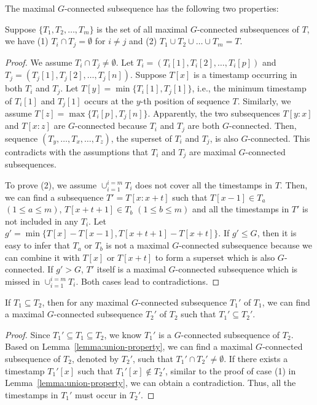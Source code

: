 The maximal $G$-connected subsequence has the following two properties:
\begin{lemma}\label{lemma:union-property}
Suppose $\{T_1,T_2,\ldots,T_m\}$ is the set of all maximal $G$-connected subsequences of $T$, we have (1) $T_i\cap T_j=\emptyset$ for $i\neq j$ and (2) $T_1\cup T_2\cup\ldots\cup T_m=T$.
\end{lemma}
\begin{proof}
We assume $T_i\cap T_j\neq \emptyset$. Let $T_i=(T_i[1], T_i[2],\ldots,T_i[p])$ and $T_j= (T_j[1], T_j[2],\ldots,T_j[n])$. Suppose $T[x]$ is a timestamp occurring in both $T_i$ and $T_j$. Let $T[y]=\min\{T_i[1],T_j[1]\}$, i.e., the minimum timestamp of $T_i[1]$ and $T_j[1]$ occurs at the $y$-th position of sequence $T$. Similarly, we assume $T[z]=\max\{T_i[p], T_j[n]\}$. Apparently, the two subsequences $T[y:x]$ and $T[x:z]$ are $G$-connected because $T_i$ and $T_j$ are both $G$-connected. Then, sequence $(T_y,\ldots,T_x,\ldots,T_z)$, the superset of $T_i$ and $T_j$, is also $G$-connected. This contradicts with the assumptions that $T_i$ and $T_j$ are maximal $G$-connected subsequences. 




To prove (2), we assume $\cup_{i=1}^{i=m} T_i$ does not cover all the timestamps in $T$. Then, we can find a subsequence $T'=T[x:x+t]$ such that $T[x-1]\in T_a$ $(1\leq a\leq m)$, $T[x+t+1]\in T_b$ $(1\leq b\leq m)$ and all the timestamps in $T'$ is not included in any $T_i$. Let $g'=\min\{T[x]-T[x-1], T[x+t+1]-T[x+t]\}$. If $g'\leq G$, then it is easy to infer that $T_a$ or $T_b$ is not a maximal $G$-connected subsequence because we can combine it with $T[x]$ or $T[x+t]$  to form a superset which is also $G$-connected. If $g'>G$, $T'$ itself is a maximal $G$-connected subsequence which is missed in $\cup_{i=1}^{i=m} T_i$. Both cases lead to contradictions.
\end{proof}




\begin{lemma}\label{lemma:subset-property}
If $T_1 \subseteq T_2$, then for any maximal $G$-connected subsequence $T_1'$ of $T_1$, we can find a maximal $G$-connected subsequence $T_2'$ of $T_2$ such that %
$T_1' \subseteq T_2'$.
\end{lemma}
\begin{proof}
Since $T_1' \subseteq T_1 \subseteq T_2 $, we know $T_1'$ is a $G$-connected subsequence of $T_2$. Based on Lemma~\ref{lemma:union-property}, we can find a maximal $G$-connected subsequence of $T_2$, denoted by $T_2'$, such that $T_1'\cap T_2'\neq \emptyset$. If there exists a timestamp $T_1'[x]$ such that $T_1'[x]\notin T_2'$, similar to the proof of case (1) in Lemma~\ref{lemma:union-property}, we can obtain a contradiction. Thus, all the timestamps in $T_1'$ must occur in $T_2'$.
\end{proof}

